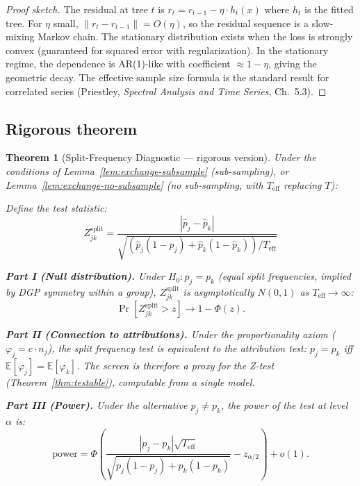 \documentclass{article}
\newtheorem{theorem}{Theorem}
\begin{document}
\begin{proof}[Proof sketch]
The residual at tree $t$ is $r_t = r_{t-1} - \eta \cdot h_t(x)$ where
$h_t$ is the fitted tree. For $\eta$ small, $\|r_t - r_{t-1}\| = O(\eta)$,
so the residual sequence is a slow-mixing Markov chain. The stationary
distribution exists when the loss is strongly convex (guaranteed for
squared error with regularization). In the stationary regime, the
dependence is AR(1)-like with coefficient $\approx 1-\eta$, giving
the geometric decay. The effective sample size formula is the standard
result for correlated series (Priestley, \emph{Spectral Analysis and
Time Series}, Ch.~5.3).
\end{proof}

\subsection{Rigorous theorem}

\begin{theorem}[Split-Frequency Diagnostic --- rigorous version]
\label{thm:split-diagnostic}
Under the conditions of Lemma~\ref{lem:exchange-subsample}
(sub-sampling), or Lemma~\ref{lem:exchange-no-subsample}
(no sub-sampling, with $T_{\text{eff}}$ replacing $T$):

Define the test statistic:
\[
    Z^{\text{split}}_{jk} = \frac{|\hat{p}_j - \hat{p}_k|}
    {\sqrt{(\hat{p}_j(1-\hat{p}_j) + \hat{p}_k(1-\hat{p}_k))/T_{\text{eff}}}}
\]

\textbf{Part I (Null distribution).}
Under $H_0: p_j = p_k$ (equal split frequencies, implied by DGP
symmetry within a group), $Z^{\text{split}}_{jk}$ is asymptotically
$N(0,1)$ as $T_{\text{eff}} \to \infty$:
\[
    \Pr[Z^{\text{split}}_{jk} > z] \to 1 - \Phi(z).
\]

\textbf{Part II (Connection to attributions).}
Under the proportionality axiom ($\varphi_j = c \cdot n_j$),
the split frequency test is equivalent to the attribution test:
$p_j = p_k$ iff $\mathbb{E}[\varphi_j] = \mathbb{E}[\varphi_k]$.
The screen is therefore a proxy for the Z-test
(Theorem~\ref{thm:testable}), computable from a single model.

\textbf{Part III (Power).}
Under the alternative $p_j \neq p_k$, the power of the test at
level $\alpha$ is:
\[
    \text{power} = \Phi\!\left(
    \frac{|p_j - p_k|\sqrt{T_{\text{eff}}}}
    {\sqrt{p_j(1-p_j) + p_k(1-p_k)}} - z_{\alpha/2}
    \right)
    + o(1).
\]
\end{theorem}
\end{document}
